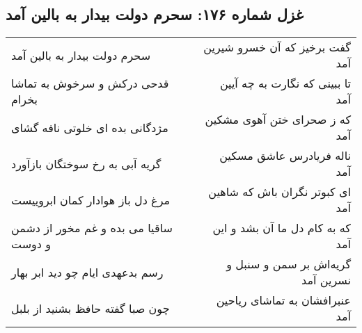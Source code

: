 \begin{center}
\section*{غزل شماره ۱۷۶: سحرم دولت بیدار به بالین آمد}
\label{sec:sh176}
\begin{longtable}{l p{0.5cm} r}
سحرم دولت بیدار به بالین آمد
&&
گفت برخیز که آن خسرو شیرین آمد
\\
قدحی درکش و سرخوش به تماشا بخرام
&&
تا ببینی که نگارت به چه آیین آمد
\\
مژدگانی بده ای خلوتی نافه گشای
&&
که ز صحرای ختن آهوی مشکین آمد
\\
گریه آبی به رخ سوختگان بازآورد
&&
ناله فریادرس عاشق مسکین آمد
\\
مرغ دل باز هوادار کمان ابروییست
&&
ای کبوتر نگران باش که شاهین آمد
\\
ساقیا می بده و غم مخور از دشمن و دوست
&&
که به کام دل ما آن بشد و این آمد
\\
رسم بدعهدی ایام چو دید ابر بهار
&&
گریه‌اش بر سمن و سنبل و نسرین آمد
\\
چون صبا گفته حافظ بشنید از بلبل
&&
عنبرافشان به تماشای ریاحین آمد
\\
\end{longtable}
\end{center}
